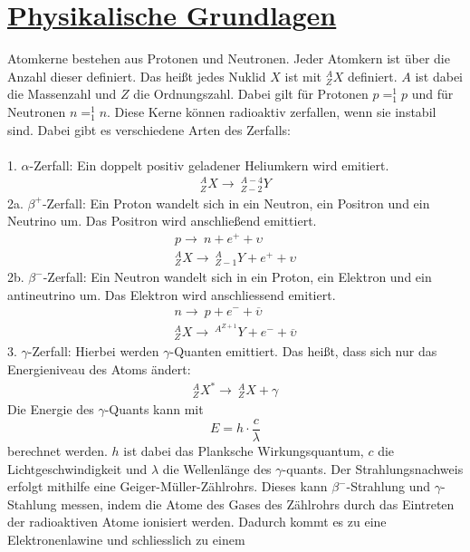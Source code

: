 \documentclass[11pt,a4paper]{article}
\begin{document}
 \section{\underline{Physikalische Grundlagen}}
  Atomkerne bestehen aus Protonen und Neutronen. Jeder Atomkern ist \"uber die
  Anzahl dieser definiert. Das hei{\ss}t jedes Nuklid $X$ ist mit $^{A}_{Z}{X}$ definiert.
  $A$ ist dabei die Massenzahl und $Z$ die Ordnungszahl. Dabei gilt f\"ur Protonen $p=^{1}_{1}{p}$
  und f\"ur Neutronen $n=^{1}_{1}{n}$. Diese Kerne k\"onnen radioaktiv zerfallen, wenn sie 
  instabil sind. Dabei gibt es verschiedene Arten des Zerfalls: \\\\
  1. $\alpha$-Zerfall: Ein doppelt positiv geladener Heliumkern wird emitiert.
   \begin{align}
    ^{A}_{Z}{X} \rightarrow~^{A-4}_{Z-2}{Y}
   \end{align}
  2a. ${\beta}^{+}$-Zerfall: Ein Proton wandelt sich in ein Neutron, ein Positron und ein Neutrino um.
  Das Positron wird anschlie{\ss}end emittiert.
   \begin{align}
    p \rightarrow~n + {e}^{+} + \upsilon \\
    ^{A}_{Z}{X} \rightarrow~^{A}_{Z-1}{Y} + {e}^{+} + \upsilon
   \end{align}
  2b. ${\beta}^{-}$-Zerfall: Ein Neutron wandelt sich in ein Proton, ein Elektron und ein antineutrino
  um. Das Elektron wird anschliessend emitiert.
   \begin{align}
    n \rightarrow~p + {e}^{-} + \overline{\upsilon} \\ 
    ^{A}_{Z}{X} \rightarrow~^{A}^{Z+1}{Y} + {e}^{-} + \overline{\upsilon}
   \end{align}
  3. $\gamma$-Zerfall: Hierbei werden $\gamma$-Quanten emittiert. Das hei{\ss}t, dass sich nur das
  Energieniveau des Atoms \"andert:
   \begin{align}
    ^{A}_{Z}{X}^{*} \rightarrow~^{A}_{Z}{X} + \gamma
   \end{align}
  Die Energie des $\gamma$-Quants kann mit 
   \begin{equation}
    E = h \cdot \frac{c}{\lambda}
   \end{equation}
  berechnet werden. 
  $h$ ist dabei das Planksche Wirkungsquantum, $c$ die Lichtgeschwindigkeit und $\lambda$ die Wellenl\"ange des $\gamma$-quants.
  Der Strahlungsnachweis erfolgt mithilfe eine Geiger-M\"uller-Z\"ahlrohrs. Dieses kann ${\beta}^{-}$-Strahlung und $\gamma$-Stahlung messen,
  indem die Atome des Gases des Z\"ahlrohrs durch das Eintreten der radioaktiven Atome ionisiert werden. Dadurch kommt es zu eine Elektronenlawine und schliesslich zu einem
\end{document}
